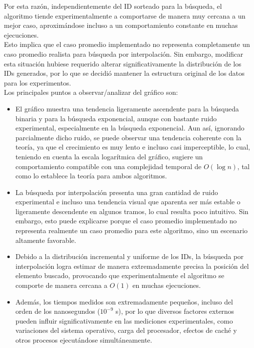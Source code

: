 Por esta razón, independientemente del ID sorteado para la búsqueda, el algoritmo tiende experimentalmente a comportarse de manera muy cercana a 
un mejor caso, aproximándose incluso a un comportamiento constante en muchas ejecuciones. \\

Esto implica que el caso promedio implementado no representa completamente un caso promedio realista para búsqueda por interpolación.  Sin embargo, 
modificar esta situación hubiese requerido alterar significativamente la distribución de los IDs generados, por lo que se decidió mantener la 
estructura original de los datos para los experimentos. \\

Los principales puntos a observar/analizar del gráfico son: \\

\begin{itemize}
    \item El gráfico muestra una tendencia ligeramente ascendente para la búsqueda binaria y para la búsqueda exponencial, 
          aunque con bastante ruido experimental, especialmente en la búsqueda exponencial.  Aun así, ignorando parcialmente 
          dicho ruido, se puede observar una tendencia coherente con la teoría, ya que el crecimiento es muy lento e incluso 
          casi imperceptible, lo cual, teniendo en cuenta la escala logarítmica del gráfico, sugiere un comportamiento compatible 
          con una complejidad temporal de $O(\log n)$, tal como lo establece la teoría para ambos algoritmos.

    \item La búsqueda por interpolación presenta una gran cantidad de ruido experimental e incluso una tendencia visual que 
          aparenta ser más estable o ligeramente descendente en algunos tramos, lo cual resulta poco intuitivo.  Sin embargo, 
          esto puede explicarse porque el caso promedio implementado no representa realmente un caso promedio para este algoritmo, 
          sino un escenario altamente favorable.

    \item Debido a la distribución incremental y uniforme de los IDs, la búsqueda por interpolación logra estimar de manera 
          extremadamente precisa la posición del elemento buscado, provocando que experimentalmente el algoritmo se comporte 
          de manera cercana a $O(1)$ en muchas ejecuciones.

    \item Además, los tiempos medidos son extremadamente pequeños, incluso del orden de los nanosegundos ($10^{-9}$ s), por lo 
          que diversos factores externos pueden influir significativamente en las mediciones experimentales, como variaciones 
          del sistema operativo, carga del procesador, efectos de caché y otros procesos ejecutándose simultáneamente.
\end{itemize}

